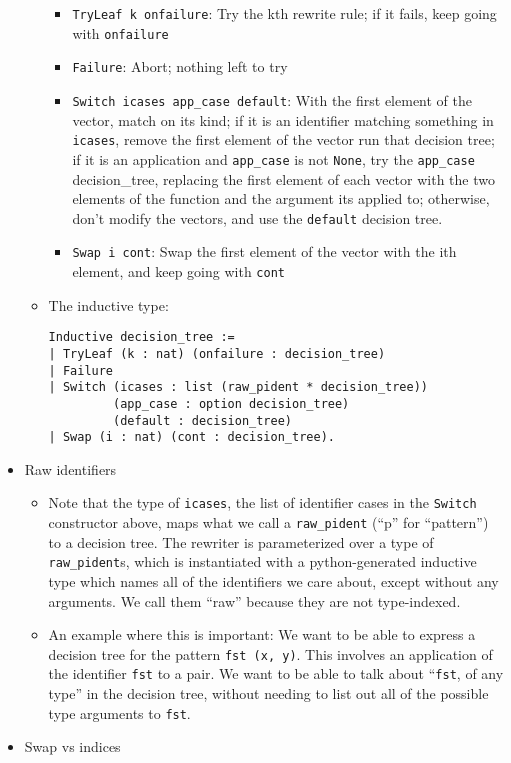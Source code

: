 \documentclass[
]{article}
\providecommand{\tightlist}{%
  \setlength{\itemsep}{0pt}\setlength{\parskip}{0pt}}
\begin{document}
\begin{itemize}
\begin{itemize}
    \begin{itemize}
    \tightlist
    \item
      \texttt{TryLeaf\ k\ onfailure}: Try the kth rewrite rule; if it
      fails, keep going with \texttt{onfailure}
    \item
      \texttt{Failure}: Abort; nothing left to try
    \item
      \texttt{Switch\ icases\ app\_case\ default}: With the first
      element of the vector, match on its kind; if it is an identifier
      matching something in \texttt{icases}, remove the first element of
      the vector run that decision tree; if it is an application and
      \texttt{app\_case} is not \texttt{None}, try the
      \texttt{app\_case} decision\_tree, replacing the first element of
      each vector with the two elements of the function and the argument
      its applied to; otherwise, don't modify the vectors, and use the
      \texttt{default} decision tree.
    \item
      \texttt{Swap\ i\ cont}: Swap the first element of the vector with
      the ith element, and keep going with \texttt{cont}
    \end{itemize}
  \item
    The inductive type:

\begin{verbatim}
Inductive decision_tree :=
| TryLeaf (k : nat) (onfailure : decision_tree)
| Failure
| Switch (icases : list (raw_pident * decision_tree))
         (app_case : option decision_tree)
         (default : decision_tree)
| Swap (i : nat) (cont : decision_tree).
\end{verbatim}
  \end{itemize}
\item
  Raw identifiers

  \begin{itemize}
  \tightlist
  \item
    Note that the type of \texttt{icases}, the list of identifier cases
    in the \texttt{Switch} constructor above, maps what we call a
    \texttt{raw\_pident} (``p'' for ``pattern'') to a decision tree. The
    rewriter is parameterized over a type of \texttt{raw\_pident}s,
    which is instantiated with a python-generated inductive type which
    names all of the identifiers we care about, except without any
    arguments. We call them ``raw'' because they are not type-indexed.
  \item
    An example where this is important: We want to be able to express a
    decision tree for the pattern \texttt{fst\ (x,\ y)}. This involves
    an application of the identifier \texttt{fst} to a pair. We want to
    be able to talk about ``\texttt{fst}, of any type'' in the decision
    tree, without needing to list out all of the possible type arguments
    to \texttt{fst}.
  \end{itemize}
\item
  Swap vs indices


\end{itemize}
\end{document}
